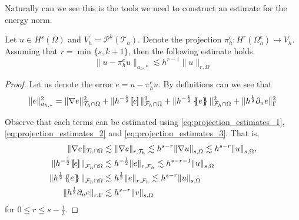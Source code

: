 
Naturally can we see this is the tools we need to construct an estimate for the energy norm.

\begin{corollary}
    \label{cor:projection_error_estimate}
    Let $u \in H^{s}( \Omega ) $ and $V_{h} = \mathcal{P} ^{k}( \mathcal{T} _{h})  $. Denote the projection $\pi ^{e}_{h}: H^{r}( \Omega ^{e} _{h}) \to V_{h}$. Assuming that $r = \min_{} \{ s, k+1\} $, then the following estimate holds. \[
    \| u - \pi ^{e}_{h}u \|_{a_{h},*}^{  } \lesssim h^{r-1} \| u \|_{ r, \Omega  }^{  }
    \]
\end{corollary}

\begin{proof}
    Let us denote the error $e = u - \pi _{h}^{e} u$. By definitions can we see that \[
    \| e \|_{ a_{h,*} }^{ 2 } = \| \nabla e \|_{\mathcal{T}_{h} \cap \Omega }   ^{  2} + \| h^{-\frac{1}{2}}  \jump{ e }   \|_{ \mathcal{F}_{h} \cap  \Omega   }^{  2}
    +   \|h^{-\frac{1}{2}} \mean{ e }    \|_{ \mathcal{F} _{h} \cap \Omega   }^{  2} + \| h^{\frac{1}{2}} \partial _{n} e \|_{ \Gamma   }^{2  }
    \]

    Observe that each terms can be estimated using \eqref{eq:projection_estimates_1}, \eqref{eq:projection_estimates_2} and \eqref{eq:projection_estimates_3}. That is,
                \begin{align}
                    \| \nabla e \|_{\mathcal{T}_{h} \cap \Omega } &\lesssim \| \nabla  e \|_{r, \mathcal{T} _{h} }^{  }  \lesssim h^{s-r} \| \nabla  u \|_{ s, \Omega  }^{  } \lesssim h^{s-r} \|  u \|_{ s, \Omega  }^{  },  \\
                    \| h^{-\frac{1}{2}}  \jump{ e }   \|_{ \mathcal{F}_{h} \cap  \Omega   }^{  } &\lesssim  h^{-\frac{1}{2}} \| e \|_{ r, \mathcal{F} _{h} }^{  }  \lesssim h^{s-r-1} \| u \|_{ s, \Omega  }^{  } \\
                    \| h^{\frac{1}{2}}  \mean{ e }   \|_{ \mathcal{F}_{h} \cap  \Omega   }^{  } &\lesssim  h^{\frac{1}{2}} \| e \|_{ r, \mathcal{F} _{h} }^{  }  \lesssim h^{s-r} \| u \|_{ s, \Omega  }^{  } \\
                    \| h^{\frac{1}{2}} \partial _{n}e \|_{ r, \Gamma }^{  }  &\lesssim h^{s-r} \| v \|_{ s, \Omega  }^{  }
                \end{align}
                for $ 0  \le  r \le   s- \frac{1}{2}$.

\end{proof}

